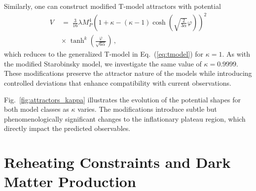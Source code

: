 \documentclass[aps,prev,twocolumn,preprintnumbers,floatfix,nofootinbib]{revtex4-1}
\begin{document}
Similarly, one can construct modified T-model attractors with potential
\begin{equation}
\begin{aligned}
    \label{eq:modtmodel}
    V \; &= \; \frac{3}{16} \lambda M_P^4 \left( 
    1 + \kappa - (\kappa - 1) \cosh\left( \sqrt{\frac{2}{3\alpha}}\varphi \right)
    \right)^2\\
\; &\times \;\tanh^k\left( \frac{\varphi}{\sqrt{6\alpha}} \right) \, ,
\end{aligned}
\end{equation}
which reduces to the generalized T-model in Eq.~(\ref{eq:tmodel}) for $\kappa = 1$. 
As with the modified Starobinsky model, we investigate the same value of $\kappa = 0.9999$. These modifications preserve the attractor nature of the models while introducing controlled deviations that enhance compatibility with current observations. 

Fig.~\ref{fig:attractors_kappa} illustrates the evolution of the potential shapes for both model classes as $\kappa$ varies. The modifications introduce subtle but phenomenologically significant changes to the inflationary plateau region, which directly impact the predicted observables.


\section{Reheating Constraints and Dark Matter Production}
\label{sec:reheating}
\end{document}
